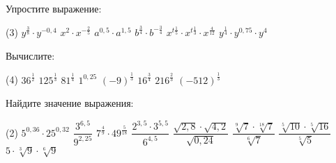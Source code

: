 \begin{class}[number=2]
	\begin{listofex}
		\item Упростите выражение:
		\begin{tasks}(3)
			\task \( y^{\tfrac{3}{8}} \cdot y^{-0,4} \)
			\task \( x^2 \cdot x^{-\tfrac{2}{5}} \)
			\task \( a^{0,5} \cdot a^{1,5} \)
			\task \( b^{\tfrac{3}{4}} \cdot b^{-\tfrac{3}{4}} \)
			\task \( x^{t\frac{1}{5}} \cdot x^{t\frac{1}{3}} \cdot x^{\frac{4}{12}} \)
			\task \( y^{\tfrac{1}{4}} \cdot y^{0,75} \cdot y^{4} \)
		\end{tasks}
		\item Вычислите: 
		\begin{tasks}(4)
			\task \( 36^{\tfrac{1}{2}} \)
			\task \( 125^{\tfrac{1}{3}} \)
			\task \( 81^{\tfrac{1}{4}} \)
			\task \( 1^{0,25} \)
			\task \( (-9)^{\tfrac{1}{3}} \)
			\task \( 16^{\tfrac{3}{4}} \)
			\task \( 216^{\tfrac{2}{3}} \)
			\task \( (-512)^{\tfrac{1}{3}} \)
		\end{tasks}
		
		\item Найдите значение выражения: %
		\begin{tasks}(2)
			\task \(5^{0,36} \cdot 25^{0,32}  \)
			\task \( \dfrac{3^{6,5}}{9^{2,25}} \)
			\task \( 7^{\tfrac{4}{9}} \cdot 49^{\tfrac{5}{18}} \)
			\task \( \dfrac{2^{3,5} \cdot 3^{5,5}}{6^{4,5}} \)
			\task \( \dfrac{\sqrt{2,8} \cdot \sqrt{4,2}}{\sqrt{0,24}} \)
			\task \( \dfrac{\sqrt[9]{7} \cdot \sqrt[18]{7}}{\sqrt[6]{7}} \)
			\task \( \dfrac{\sqrt[5]{10} \cdot \sqrt[5]{16}}{\sqrt[5]{5}} \)
			\task \( 5 \cdot \sqrt[3]{9} \cdot \sqrt[6]{9} \)
		\end{tasks}
		

\end{listofex}
\end{class}
